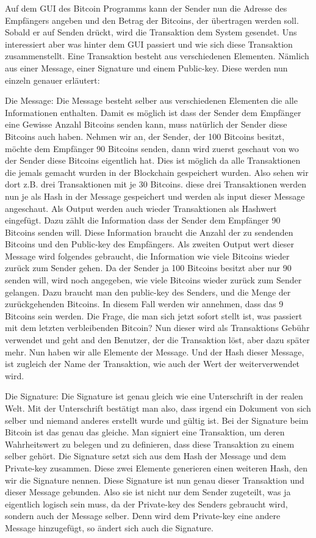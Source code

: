 \noindent
Auf dem GUI des Bitcoin Programms kann der Sender nun die Adresse des Empfängers angeben und den Betrag der Bitcoins, der übertragen werden soll.
Sobald er auf Senden drückt, wird die Transaktion dem System gesendet. Uns interessiert aber was hinter dem GUI passiert und wie sich diese Transaktion zusammenstellt.
Eine Transaktion besteht aus verschiedenen Elementen. Nämlich aus einer Message, einer Signature und einem Public-key. Diese werden nun einzeln genauer erläutert:

\noindent
Die Message:
Die Message besteht selber aus verschiedenen Elementen die alle Informationen enthalten. Damit es möglich ist dass der Sender dem Empfänger eine Gewisse Anzahl Bitcoins senden kann, muss natürlich
der Sender diese Bitcoins auch haben. Nehmen wir an, der Sender, der 100 Bitcoins besitzt, möchte dem Empfänger 90 Bitcoins senden, dann wird zuerst geschaut von wo der Sender diese Bitcoins eigentlich hat. Dies ist möglich da
alle Transaktionen die jemals gemacht wurden in der Blockchain gespeichert wurden. Also sehen wir dort z.B. drei Transaktionen mit je 30 Bitcoins. diese drei Transaktionen werden nun je als Hash in der
Message gespeichert und werden als input dieser Message angeschaut. Als Output werden auch wieder Transaktionen als Hashwert eingefügt. Dazu zählt die Information dass der Sender dem Empfänger 90 Bitcoins senden
will. Diese Information braucht die Anzahl der zu sendenden Bitcoins und den Public-key des Empfängers. Als zweiten Output wert dieser Message wird folgendes gebraucht, die Information wie viele Bitcoins wieder
zurück zum Sender gehen. Da der Sender ja 100 Bitcoins besitzt aber nur 90 senden will, wird noch angegeben, wie viele Bitcoins wieder zurück zum Sender gelangen. Dazu braucht man den public-key des Senders,
und die Menge der zurückgehenden Bitcoins. In diesem Fall werden wir annehmen, dass das 9 Bitcoins sein werden. Die Frage, die man sich jetzt sofort stellt ist, was passiert mit dem letzten verbleibenden
Bitcoin? Nun dieser wird als Transaktions Gebühr verwendet und geht and den Benutzer, der die Transaktion löst, aber dazu später mehr. Nun haben wir alle Elemente der Message. Und der Hash dieser Message, ist
zugleich der Name der Transaktion, wie auch der Wert der weiterverwendet wird.

\noindent
Die Signature:
Die Signature ist genau gleich wie eine Unterschrift in der realen Welt. Mit der Unterschrift bestätigt man also, dass irgend ein Dokument von sich selber und niemand anderes erstellt wurde und gültig ist.
Bei der Signature beim Bitcoin ist das genau das gleiche. Man signiert eine Transaktion, um deren Wahrheitswert zu belegen und zu definieren, dass diese Transaktion zu einem selber gehört. Die Signature
setzt sich aus dem Hash der Message und dem Private-key zusammen. Diese zwei Elemente generieren einen weiteren Hash, den wir die Signature nennen. Diese Signature ist nun genau dieser Transaktion
und dieser Message gebunden. Also sie ist nicht nur dem Sender zugeteilt, was ja eigentlich logisch sein muss, da der Private-key des Senders gebraucht wird, sondern auch der Message selber. Denn wird
dem Private-key eine andere Message hinzugefügt, so ändert sich auch die Signature.

